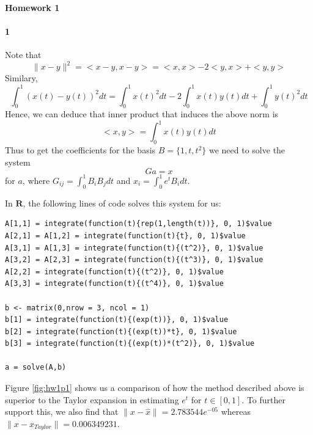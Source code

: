 \documentclass[12pt, leqno]{article}
\providecommand{\norm}[1]{\lVert#1\rVert} %
\begin{document}
\pagestyle{fancy}

\begin{center}
{\large {\bf Homework 1}} \\
\end{center}

\paragraph{1}
Note that 
$$
\norm{x-y}^2 = <x-y,x-y> = <x,x> - 2<y,x> + <y,y>
$$
 Similary, 
$$
\int_0^1(x(t)-y(t))^2 dt = \int_0^1 x(t)^2 dt - 2 \int_0^1 x(t)y(t) dt + \int_0^1 y(t)^2 dt
$$
Hence, we can deduce that inner product that induces the above norm is 
$$
<x,y> = \int_0^1 x(t)y(t) dt
$$
Thus to get the coefficients for the basis $B = \{1,t,t^2\}$ we need to solve the system 
$$
Ga = x
$$
for $a$, where $G_{ij} = \int_0^1B_iB_j dt$ and $x_i = \int_0^1 e^t B_i dt $. 

In $\mathbf{R}$, the following lines of code solves this system for us:
\begin{verbatim}
A[1,1] = integrate(function(t){rep(1,length(t))}, 0, 1)$value
A[2,1] = A[1,2] = integrate(function(t){t}, 0, 1)$value
A[3,1] = A[1,3] = integrate(function(t){(t^2)}, 0, 1)$value
A[3,2] = A[2,3] = integrate(function(t){(t^3)}, 0, 1)$value
A[2,2] = integrate(function(t){(t^2)}, 0, 1)$value
A[3,3] = integrate(function(t){(t^4)}, 0, 1)$value

b <- matrix(0,nrow = 3, ncol = 1)
b[1] = integrate(function(t){(exp(t))}, 0, 1)$value
b[2] = integrate(function(t){(exp(t))*t}, 0, 1)$value
b[3] = integrate(function(t){(exp(t))*(t^2)}, 0, 1)$value

a = solve(A,b)
\end{verbatim}

Figure \ref{fig:hw1p1} shows us a comparison of how the method described above is superior to the Taylor expansion in estimating $e^t$ for $t \in [0,1]$. To further support this, we also find that $\norm{x-\hat{x}} = 2.783544e^{-05}$ whereas $\norm{x-x_{Taylor}} = 0.006349231$.
\end{document}
